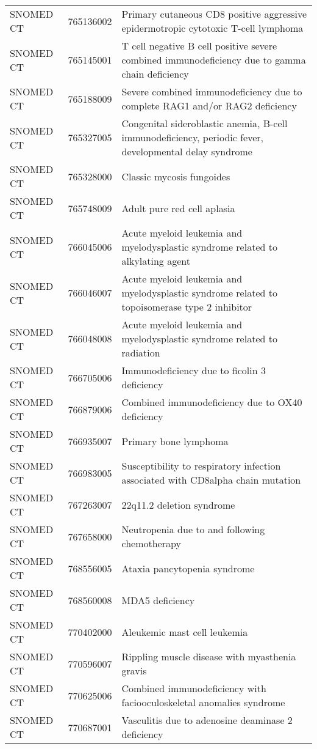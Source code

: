 \begin{longtable}{p{}p{}p{}}
  SNOMED CT & 765136002 & Primary cutaneous CD8 positive aggressive epidermotropic cytotoxic T-cell lymphoma \\ 
  SNOMED CT & 765145001 & T cell negative B cell positive severe combined immunodeficiency due to gamma chain deficiency \\ 
  SNOMED CT & 765188009 & Severe combined immunodeficiency due to complete RAG1 and/or RAG2 deficiency \\ 
  SNOMED CT & 765327005 & Congenital sideroblastic anemia, B-cell immunodeficiency, periodic fever, developmental delay syndrome \\ 
  SNOMED CT & 765328000 & Classic mycosis fungoides \\ 
  SNOMED CT & 765748009 & Adult pure red cell aplasia \\ 
  SNOMED CT & 766045006 & Acute myeloid leukemia and myelodysplastic syndrome related to alkylating agent \\ 
  SNOMED CT & 766046007 & Acute myeloid leukemia and myelodysplastic syndrome related to topoisomerase type 2 inhibitor \\ 
  SNOMED CT & 766048008 & Acute myeloid leukemia and myelodysplastic syndrome related to radiation \\ 
  SNOMED CT & 766705006 & Immunodeficiency due to ficolin 3 deficiency \\ 
  SNOMED CT & 766879006 & Combined immunodeficiency due to OX40 deficiency \\ 
  SNOMED CT & 766935007 & Primary bone lymphoma \\ 
  SNOMED CT & 766983005 & Susceptibility to respiratory infection associated with CD8alpha chain mutation \\ 
  SNOMED CT & 767263007 & 22q11.2 deletion syndrome \\ 
  SNOMED CT & 767658000 & Neutropenia due to and following chemotherapy \\ 
  SNOMED CT & 768556005 & Ataxia pancytopenia syndrome \\ 
  SNOMED CT & 768560008 & MDA5 deficiency \\ 
  SNOMED CT & 770402000 & Aleukemic mast cell leukemia \\ 
  SNOMED CT & 770596007 & Rippling muscle disease with myasthenia gravis \\ 
  SNOMED CT & 770625006 & Combined immunodeficiency with faciooculoskeletal anomalies syndrome \\ 
  SNOMED CT & 770687001 & Vasculitis due to adenosine deaminase 2 deficiency \\ 

\end{longtable}
